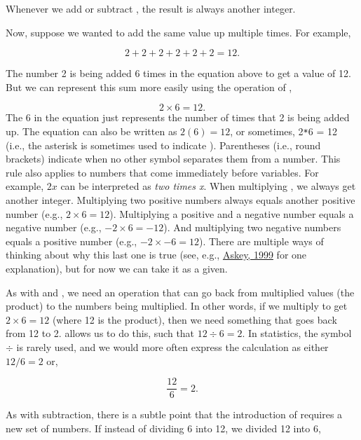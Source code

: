 \documentclass[
  openany]{krantz}
\begin{document}
Whenever we add or subtract , the result is always another integer.

Now, suppose we wanted to add the same value up multiple times.
For example,

\[2 + 2 + 2 + 2 + 2 + 2 = 12.\]

The number 2 is being added 6 times in the equation above to get a value of 12.
But we can represent this sum more easily using the operation of ,

\[2 \times 6 = 12.\]
The 6 in the equation just represents the number of times that 2 is being added up.
The equation can also be written as \(2(6) = 12\), or sometimes, 2\texttt{*}6 = 12 (i.e., the asterisk is sometimes used to indicate ).
Parentheses (i.e., round brackets) indicate  when no other symbol separates them from a number.
This rule also applies to numbers that come immediately before variables.
For example, \(2x\) can be interpreted as \emph{two times x}.
When multiplying , we always get another integer.
Multiplying two positive numbers always equals another positive number (e.g., \(2 \times 6 = 12\)).
Multiplying a positive and a negative number equals a negative number (e.g., \(-2 \times 6 = -12\)).
And multiplying two negative numbers equals a positive number (e.g., \(-2 \times -6 = 12\)).
There are multiple ways of thinking about why this last one is true (see, e.g., \protect\hyperlink{ref-Askey1999}{Askey, 1999} for one explanation), but for now we can take it as a given.

\newpage

As with  and , we need an operation that can go back from multiplied values (the product) to the numbers being multiplied.
In other words, if we multiply to get \(2 \times 6 = 12\) (where 12 is the product), then we need something that goes back from 12 to 2.
 allows us to do this, such that \(12 \div 6 = 2\).
In statistics, the symbol \(\div\) is rarely used, and we would more often express the calculation as either \(12/6 = 2\) or,

\[\frac{12}{6} = 2.\]

As with subtraction, there is a subtle point that the introduction of  requires a new set of numbers.
If instead of dividing 6 into 12, we divided 12 into 6,
\end{document}
